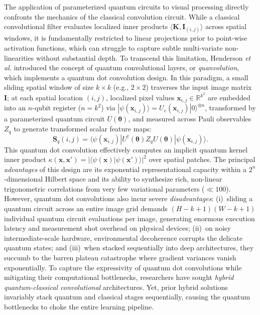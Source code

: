 \documentclass[pdflatex,sn-mathphys-num]{sn-jnl}%
\theoremstyle{thmstyleone}%
\theoremstyle{thmstyletwo}%
\theoremstyle{thmstylethree}%
\begin{document}
The application of parameterized quantum circuits to visual processing directly confronts the mechanics of the classical convolution circuit. While a classical convolutional filter evaluates localized inner products $\langle \mathbf{K}, \mathbf{I}_{(i,j)} \rangle$ across spatial windows, it is fundamentally restricted to linear projections prior to point-wise activation functions, which can struggle to capture subtle multi-variate non-linearities without substantial depth. To transcend this limitation, Henderson \textit{et al.} \cite{henderson2020quanvolutional} introduced the concept of quantum convolutional layers, or \textit{quanvolution}, which implements a quantum dot convolution design. In this paradigm, a small sliding spatial window of size $k \times k$ (e.g., $2 \times 2$) traverses the input image matrix $\mathbf{I}$; at each spatial location $(i, j)$, localized pixel values $\mathbf{x}_{i,j} \in \mathbb{R}^{k^2}$ are embedded into an $n$-qubit register ($n = k^2$) via $|\psi(\mathbf{x}_{i,j})\rangle = U_e(\mathbf{x}_{i,j}) |0\rangle^{\otimes n}$, transformed by a parameterized quantum circuit $U(\boldsymbol{\theta})$, and measured across Pauli observables $Z_q$ to generate transformed scalar feature maps:
\begin{equation}
\mathbf{S}_q(i, j) = \langle \psi(\mathbf{x}_{i,j}) | U^\dagger(\boldsymbol{\theta}) Z_q U(\boldsymbol{\theta}) | \psi(\mathbf{x}_{i,j}) \rangle.
\label{eq:quantum_dot_conv}
\end{equation}
This quantum dot convolution effectively computes an implicit quantum kernel inner product $\kappa(\mathbf{x}, \mathbf{x}') = |\langle \psi(\mathbf{x}) | \psi(\mathbf{x}') \rangle|^2$ over spatial patches. The principal \textit{advantages} of this design are its exponential representational capacity within a $2^n$-dimensional Hilbert space and its ability to synthesize rich, non-linear trigonometric correlations from very few variational parameters ($\ll 100$). However, quantum dot convolutions also incur severe \textit{disadvantages}: (i)~sliding a quantum circuit across an entire image grid demands $(H - k + 1)(W - k + 1)$ individual quantum circuit evaluations per image, generating enormous execution latency and measurement shot overhead on physical devices; (ii)~on noisy intermediate-scale hardware, environmental decoherence corrupts the delicate quantum states; and (iii)~when stacked sequentially into deep architectures, they succumb to the barren plateau catastrophe where gradient variances vanish exponentially. To capture the expressivity of quantum dot convolutions while mitigating their computational bottlenecks, researchers have sought \textit{hybrid quantum-classical convolutional} architectures. Yet, prior hybrid solutions invariably stack quantum and classical stages sequentially, causing the quantum bottlenecks to choke the entire learning pipeline.
\end{document}
